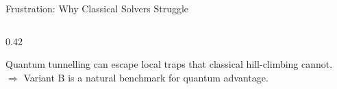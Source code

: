 \begin{frame}{Frustration: Why Classical Solvers Struggle}
\begin{columns}[T]
\begin{column}{0.42\textwidth}
            \vspace{0.3cm}
            \begin{warningbox}
                \scriptsize Quantum tunnelling can escape local traps
                that classical hill-climbing cannot.\\[2pt]
                $\Rightarrow$ Variant B is a natural benchmark
                for quantum advantage.
            \end{warningbox}
        \end{column}
    \end{columns}
\end{frame}